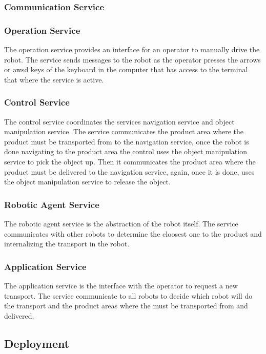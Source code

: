 \subsubsection*{Communication Service}
\subsubsection*{Operation Service}
The operation service provides an interface for an operator to manually drive the robot. The service sends messages to the robot as the operator presses the arrows or awsd keys of the keyboard in the computer that has access to the terminal that where the service is active.

\subsubsection*{Control Service}
The control service coordinates the services navigation service and object manipulation service. The service communicates the product area where the product must be transported from to the navigation service, once the robot is done navigating to the product area the control uses the object manipulation service to pick the object up. Then it communicates the product area where the product must be delivered to the navigation service, again, once it is done, uses the object manipulation service to release the object.

\subsubsection*{Robotic Agent Service}
The robotic agent service is the abstraction of the robot itself. The service communicates with other robots to determine the cloosest one to the product and internalizing the transport in the robot.

\subsubsection*{Application Service}
The application service is the interface with the operator to request a new transport. The service communicate to all robots to decide which robot will do the transport and the product areas where the must be transported from and delivered. 

\subsection{Deployment}